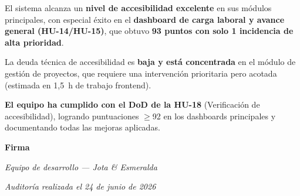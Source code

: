 \documentclass[12pt, a4paper]{article}
\begin{document}
\begin{mdframed}[
  backgroundcolor=lightgreen,
  linecolor=accentgreen,
  linewidth=1.5pt,
  innerleftmargin=14pt, innerrightmargin=14pt,
  innertopmargin=12pt, innerbottommargin=12pt
]
El sistema alcanza un \textbf{nivel de accesibilidad excelente} en sus módulos principales,
con especial éxito en el \textbf{dashboard de carga laboral y avance general (HU-14/HU-15)},
que obtuvo \textbf{93 puntos con solo 1 incidencia de alta prioridad}.

La deuda técnica de accesibilidad es \textbf{baja y está concentrada} en el módulo de
gestión de proyectos, que requiere una intervención prioritaria pero acotada (estimada
en 1,5~h de trabajo frontend).

\textbf{El equipo ha cumplido con el DoD de la HU-18} (Verificación de accesibilidad),
logrando puntuaciones $\geq$92 en los dashboards principales y documentando todas las
mejoras aplicadas.
\end{mdframed}

\vspace{2em}

\begin{mdframed}[
  backgroundcolor=sectionbg,
  linecolor=bordercolor,
  linewidth=1pt,
  innerleftmargin=14pt, innerrightmargin=14pt,
  innertopmargin=10pt, innerbottommargin=10pt
]
\textbf{Firma}\par\vspace{0.4em}
\textit{Equipo de desarrollo --- Jota \& Esmeralda}\par
\textit{Auditoría realizada el 24 de junio de 2026}
\end{mdframed}
\end{document}
